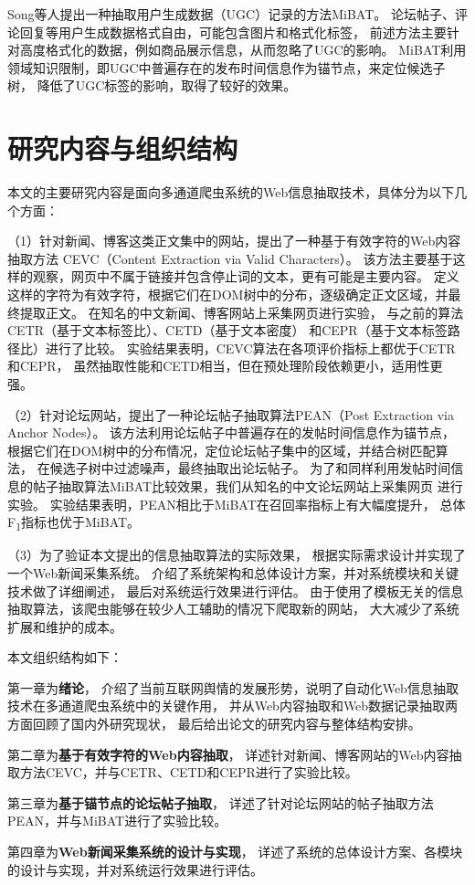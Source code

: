 Song等人提出一种抽取用户生成数据（UGC）记录的方法MiBAT。
论坛帖子、评论回复等用户生成数据格式自由，可能包含图片和格式化标签，
前述方法主要针对高度格式化的数据，例如商品展示信息，从而忽略了UGC的影响。
MiBAT利用领域知识限制，即UGC中普遍存在的发布时间信息作为锚节点，来定位候选子树，
降低了UGC标签的影响，取得了较好的效果。

\section{研究内容与组织结构}

本文的主要研究内容是面向多通道爬虫系统的Web信息抽取技术，具体分为以下几个方面：

（1）针对新闻、博客这类正文集中的网站，提出了一种基于有效字符的Web内容抽取方法
CEVC（Content Extraction via Valid Characters）。
该方法主要基于这样的观察，网页中不属于链接并包含停止词的文本，更有可能是主要内容。
定义这样的字符为有效字符，根据它们在DOM树中的分布，逐级确定正文区域，并最终提取正文。
在知名的中文新闻、博客网站上采集网页进行实验，
与之前的算法CETR（基于文本标签比）、CETD（基于文本密度）
和CEPR（基于文本标签路径比）进行了比较。
实验结果表明，CEVC算法在各项评价指标上都优于CETR和CEPR，
虽然抽取性能和CETD相当，但在预处理阶段依赖更小，适用性更强。

（2）针对论坛网站，提出了一种论坛帖子抽取算法PEAN（Post Extraction via Anchor Nodes）。
该方法利用论坛帖子中普遍存在的发帖时间信息作为锚节点，
根据它们在DOM树中的分布情况，定位论坛帖子集中的区域，并结合树匹配算法，
在候选子树中过滤噪声，最终抽取出论坛帖子。
为了和同样利用发帖时间信息的帖子抽取算法MiBAT比较效果，我们从知名的中文论坛网站上采集网页
进行实验。
实验结果表明，PEAN相比于MiBAT在召回率指标上有大幅度提升，
总体F\textsubscript{1}指标也优于MiBAT。

（3）为了验证本文提出的信息抽取算法的实际效果，
根据实际需求设计并实现了一个Web新闻采集系统。
介绍了系统架构和总体设计方案，并对系统模块和关键技术做了详细阐述，
最后对系统运行效果进行评估。
由于使用了模板无关的信息抽取算法，该爬虫能够在较少人工辅助的情况下爬取新的网站，
大大减少了系统扩展和维护的成本。

本文组织结构如下：

第一章为\textbf{绪论}，
介绍了当前互联网舆情的发展形势，说明了自动化Web信息抽取技术在多通道爬虫系统中的关键作用，
并从Web内容抽取和Web数据记录抽取两方面回顾了国内外研究现状，
最后给出论文的研究内容与整体结构安排。

第二章为\textbf{基于有效字符的Web内容抽取}，
详述针对新闻、博客网站的Web内容抽取方法CEVC，并与CETR、CETD和CEPR进行了实验比较。

第三章为\textbf{基于锚节点的论坛帖子抽取}，
详述了针对论坛网站的帖子抽取方法PEAN，并与MiBAT进行了实验比较。

第四章为\textbf{Web新闻采集系统的设计与实现}，
详述了系统的总体设计方案、各模块的设计与实现，并对系统运行效果进行评估。
